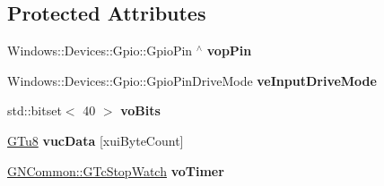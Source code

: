 \subsection*{Protected Attributes}
\begin{DoxyCompactItemize}
\item 
\mbox{\label{class_g_n_common_1_1_g_n_drivers_1_1_g_tc_d_h_t_sensor_add75ea9fe9710905cd21f853ba256375}} 
Windows\+::\+Devices\+::\+Gpio\+::\+Gpio\+Pin $^\wedge$ {\bfseries vop\+Pin}
\item 
\mbox{\label{class_g_n_common_1_1_g_n_drivers_1_1_g_tc_d_h_t_sensor_af94fdbd8a41443d69d20198ca8436add}} 
Windows\+::\+Devices\+::\+Gpio\+::\+Gpio\+Pin\+Drive\+Mode {\bfseries ve\+Input\+Drive\+Mode}
\item 
\mbox{\label{class_g_n_common_1_1_g_n_drivers_1_1_g_tc_d_h_t_sensor_a5cf37517afea9493b10cf746b01fc505}} 
std\+::bitset$<$ 40 $>$ {\bfseries vo\+Bits}
\item 
\mbox{\label{class_g_n_common_1_1_g_n_drivers_1_1_g_tc_d_h_t_sensor_abdeb7fea8d6c886c75f3a73213f57c37}} 
\mbox{\hyperlink{namespace_g_n_common_a551fbbb7c62c00956ef69d960ca9ccc3}{G\+Tu8}} {\bfseries vuc\+Data} \mbox{[}xui\+Byte\+Count\mbox{]}
\item 
\mbox{\label{class_g_n_common_1_1_g_n_drivers_1_1_g_tc_d_h_t_sensor_a94be04c4acbc94b4ba7280fd6a9756bd}} 
\mbox{\hyperlink{class_g_n_common_1_1_g_tc_stop_watch}{G\+N\+Common\+::\+G\+Tc\+Stop\+Watch}} {\bfseries vo\+Timer}
\end{DoxyCompactItemize}
